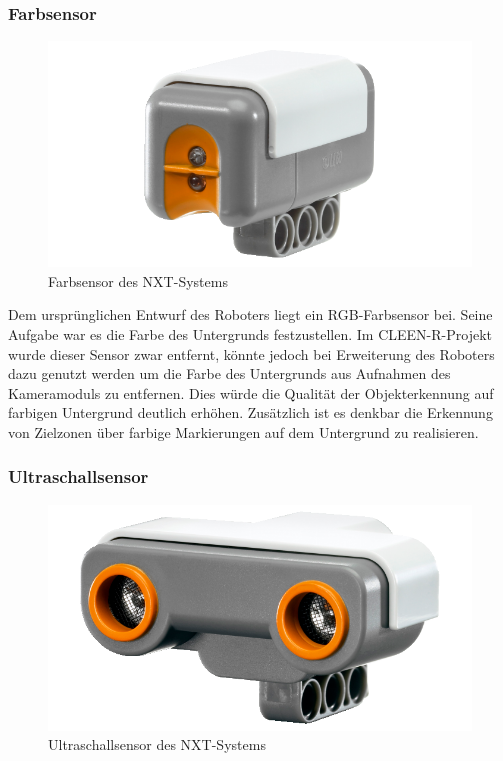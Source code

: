 \subsubsection{Farbsensor}

\begin{figure}[h]
\centering
\includegraphics[width=\textwidth/3]{Bilder/Robot/color_sensor}
\caption{Farbsensor des NXT-Systems}
\label{fig:colorSensor}
\end{figure}

Dem ursprünglichen Entwurf des Roboters liegt ein RGB-Farbsensor bei. Seine Aufgabe war es die Farbe des Untergrunds festzustellen. Im CLEEN-R-Projekt wurde dieser Sensor zwar entfernt, könnte jedoch bei Erweiterung des Roboters dazu genutzt werden um die Farbe des Untergrunds aus Aufnahmen des Kameramoduls zu entfernen. Dies würde die Qualität der Objekterkennung auf farbigen Untergrund deutlich erhöhen. Zusätzlich ist es denkbar die Erkennung von Zielzonen über farbige Markierungen auf dem Untergrund zu realisieren.

\subsubsection{Ultraschallsensor}
\label{subsec:Ultraschallsensor}

\begin{figure}[h]
\centering
\includegraphics[width=\textwidth/3]{Bilder/Robot/distance_sensor}
\caption{Ultraschallsensor des NXT-Systems}
\label{fig:distanceSensor}
\end{figure}

